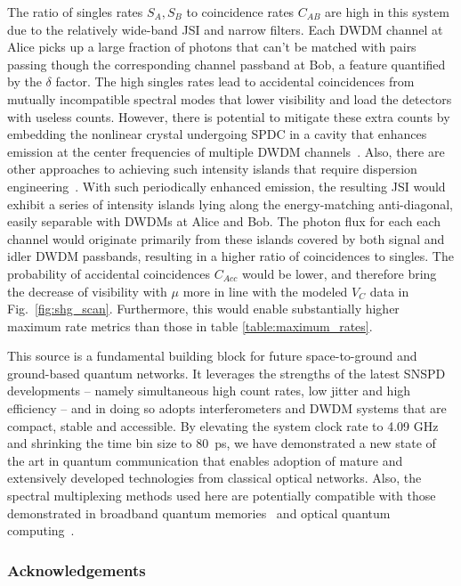 \documentclass[11pt]{caltech_thesis} %
\begin{document}
The ratio of singles rates $S_A, S_B$ to coincidence rates $C_{AB}$ are high in this system due to the relatively wide-band JSI and narrow filters. Each DWDM channel at Alice picks up a large fraction of photons that can't be matched with pairs passing though the corresponding channel passband at Bob, a feature quantified by the $\delta$ factor. The high singles rates lead to accidental coincidences from mutually incompatible spectral modes that lower visibility and load the detectors with useless counts. However, there is potential to mitigate these extra counts by embedding the nonlinear crystal undergoing SPDC in a cavity that enhances emission at the center frequencies of multiple DWDM channels~\autocite{Pomarico2009,Brydges2023,slattery2019background}. Also, there are other approaches to achieving such intensity islands that require dispersion engineering~\autocite{morrison2022frequency,xin2022spectrally}. With such periodically enhanced emission, the resulting JSI would exhibit a series of intensity islands lying along the energy-matching anti-diagonal, easily separable with DWDMs at Alice and Bob. The photon flux for each each channel would originate primarily from these islands covered by both signal and idler DWDM passbands, resulting in a higher ratio of coincidences to singles. The probability of accidental coincidences $C_{Acc}$ would be lower, and therefore bring the decrease of visibility with $\mu$ more in line with the modeled $V_C$ data in Fig.~\ref{fig:shg_scan}. Furthermore, this would enable substantially higher maximum rate metrics than those in table \ref{table:maximum_rates}.

This source is a fundamental building block for future space-to-ground and ground-based quantum networks. It leverages the strengths of the latest SNSPD developments -- namely simultaneous high count rates, low jitter and high efficiency -- and in doing so adopts interferometers and DWDM systems that are compact, stable and accessible. By elevating the system clock rate to 4.09 GHz and shrinking the time bin size to 80~ps, we have demonstrated a new state of the art in quantum communication that enables adoption of mature and extensively developed technologies from classical optical networks. Also, the spectral multiplexing methods used here are potentially compatible with those demonstrated in broadband quantum memories~\autocite{Sinclair2014} and optical quantum computing~\autocite{lukens2017frequency}.

\hypertarget{acknowledgements-1}{%
\subsubsection{Acknowledgements}\label{acknowledgements-1}}
\end{document}
